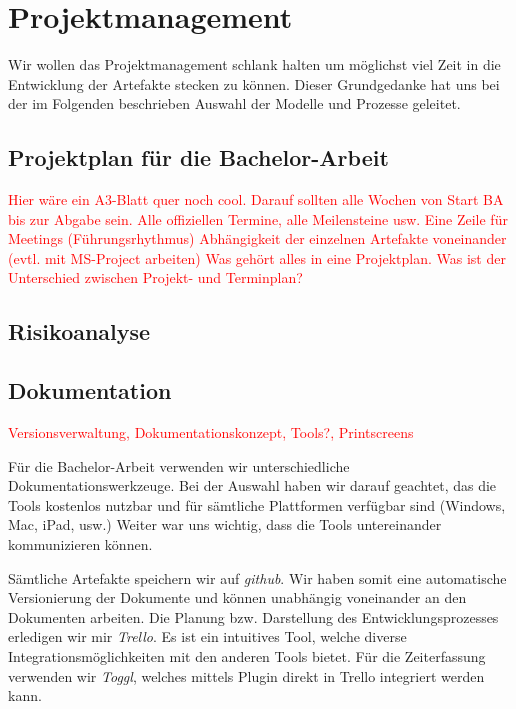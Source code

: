 \documentclass[a4paper,ngerman, 11pt, pagesize]{report}
\newcommand\Diskussionspunkt[1]{\textcolor{red}{#1}}
\begin{document}
\chapter{Projektmanagement}
Wir wollen das Projektmanagement schlank halten um möglichst viel Zeit in die Entwicklung der Artefakte stecken zu können.
Dieser Grundgedanke hat uns bei der im Folgenden beschrieben Auswahl der Modelle und Prozesse geleitet.



\section{Projektplan für die Bachelor-Arbeit}
\Diskussionspunkt{Hier wäre ein A3-Blatt quer noch cool. Darauf sollten alle Wochen von Start BA bis zur Abgabe sein.
Alle offiziellen Termine, alle Meilensteine usw.
Eine Zeile für Meetings (Führungsrhythmus)
Abhängigkeit der einzelnen Artefakte voneinander (evtl. mit MS-Project arbeiten)
Was gehört alles in eine Projektplan. Was ist der Unterschied zwischen Projekt- und Terminplan?}


\section{Risikoanalyse}
   


\section{Dokumentation}
\Diskussionspunkt{Versionsverwaltung, Dokumentationskonzept, Tools?, Printscreens}

Für die Bachelor-Arbeit verwenden wir unterschiedliche Dokumentationswerkzeuge. Bei der Auswahl haben wir darauf geachtet, das die Tools kostenlos nutzbar und für sämtliche Plattformen verfügbar sind (Windows, Mac, iPad, usw.) Weiter war uns wichtig, dass die Tools untereinander kommunizieren können. 

Sämtliche Artefakte speichern wir auf \textit{github}. Wir haben somit eine automatische Versionierung der Dokumente und können unabhängig voneinander an den Dokumenten arbeiten. Die Planung bzw. Darstellung des Entwicklungsprozesses erledigen wir mir \textit{Trello}. Es ist ein intuitives Tool, welche diverse Integrationsmöglichkeiten mit den anderen Tools bietet. Für die Zeiterfassung verwenden wir \textit{Toggl}, welches mittels Plugin direkt in Trello integriert werden kann.
\end{document}
